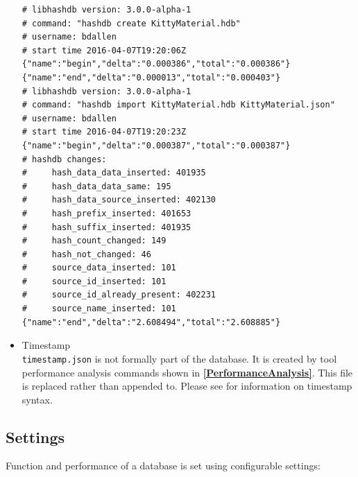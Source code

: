 \documentclass[11pt,fleqn]{article} %
\begin{document}
\begin{itemize}
\lstset{style=customfile}
\begin{lstlisting}[float, caption=An example \texttt{log.xml} log file showing a database creation entry and a datase import entry, label=logfile]
# libhashdb version: 3.0.0-alpha-1
# command: "hashdb create KittyMaterial.hdb"
# username: bdallen
# start time 2016-04-07T19:20:06Z
{"name":"begin","delta":"0.000386","total":"0.000386"}
{"name":"end","delta":"0.000013","total":"0.000403"}
# libhashdb version: 3.0.0-alpha-1
# command: "hashdb import KittyMaterial.hdb KittyMaterial.json"
# username: bdallen
# start time 2016-04-07T19:20:23Z
{"name":"begin","delta":"0.000387","total":"0.000387"}
# hashdb changes:
#     hash_data_data_inserted: 401935
#     hash_data_data_same: 195
#     hash_data_source_inserted: 402130
#     hash_prefix_inserted: 401653
#     hash_suffix_inserted: 401935
#     hash_count_changed: 149
#     hash_not_changed: 46
#     source_data_inserted: 101
#     source_id_inserted: 101
#     source_id_already_present: 402231
#     source_name_inserted: 101
{"name":"end","delta":"2.608494","total":"2.608885"}
\end{lstlisting}


\item Timestamp\\
\verb+timestamp.json+ is not formally part of the \hdb database.  It is created by \hdb tool performance analysis commands shown in \textbf{\autoref{PerformanceAnalysis}}. This file is replaced rather than appended to. Please see \textbf{} for information on timestamp syntax.

\end{itemize}



\subsection{Settings}
\label{Settings}
Function and performance of a \hdb database is set using configurable settings:\\
\end{document}
